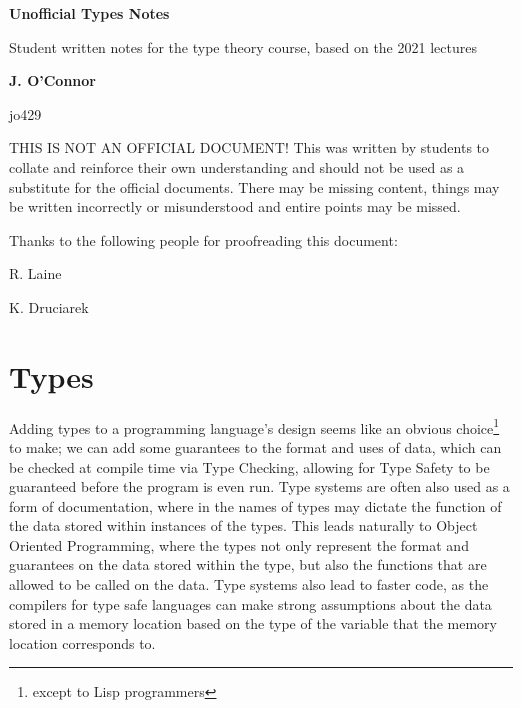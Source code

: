 \documentclass{article}
\author{J. O'Connor}
\date{December 2021}
\begin{document}
\begin{titlepage}
    \begin{center}
        \vspace*{1cm}
            
        \Huge
        \textbf{Unofficial Types Notes}
            
        \vspace{0.5cm}
        \LARGE
        Student written notes for the type theory course, based on the 2021 lectures
            
        \vspace{1.5cm}
            
        \textbf{J. O'Connor} 
        
        jo429
            
        \vfill
            
        THIS IS NOT AN OFFICIAL DOCUMENT! This was written by students to collate and reinforce their own understanding and should not be used as a substitute for the official documents. There may be missing content, things may be written incorrectly or misunderstood and entire points may be missed. 
            
        \vspace{0.8cm}
        
        \Large
        Thanks to the following people for proofreading this document: 
        
        R. Laine
        
        K. Druciarek
            
    \end{center}
\end{titlepage}

\setlength{\parskip}{-0.5em}
\tableofcontents
\setlength{\parskip}{1em}

\newpage
\section{Types}

Adding types to a programming language's design seems like an obvious choice\footnote{except to Lisp programmers} to make; we can add some guarantees to the format and uses of data, which can be checked at compile time via Type Checking, allowing for Type Safety to be guaranteed before the program is even run. Type systems are often also used as a form of documentation, where in the names of types may dictate the function of the data stored within instances of the types. This leads naturally to Object Oriented Programming, where the types not only represent the format and guarantees on the data stored within the type, but also the functions that are allowed to be called on the data. Type systems also lead to faster code, as the compilers for type safe languages can make strong assumptions about the data stored in a memory location based on the type of the variable that the memory location corresponds to. 
\end{document}
